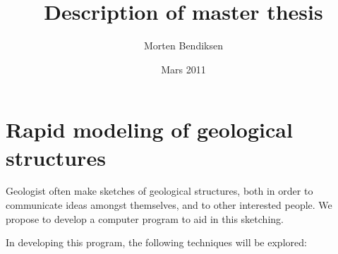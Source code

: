 \documentclass[12pt,a4paper]{article}
\begin{document}
\title{Description of master thesis}
\author{Morten Bendiksen}
\date{Mars 2011}
\maketitle

\section*{Rapid modeling of geological structures}


Geologist often make sketches of geological structures, both in order to communicate ideas amongst themselves, and to other interested people. We propose to develop a computer program to aid in this sketching.

In developing this program, the following techniques will be explored:
\end{document}
